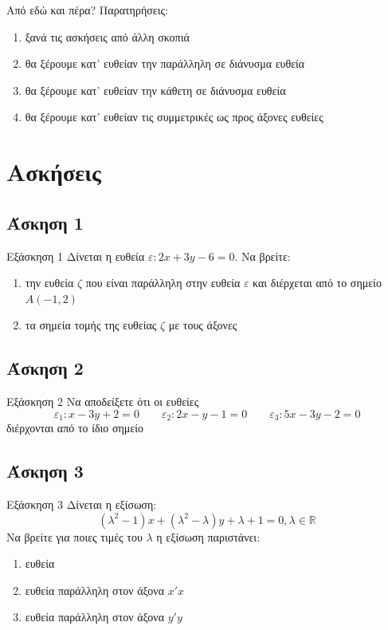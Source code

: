 \documentclass[greek]{beamer}
\begin{document}
\begin{frame}{Από εδώ και πέρα?}
 Παρατηρήσεις:
 \begin{enumerate}
  \item<1-> ξανά τις ασκήσεις από άλλη σκοπιά
  \item<2-> θα ξέρουμε κατ' ευθείαν την παράλληλη σε διάνυσμα ευθεία
  \item<3-> θα ξέρουμε κατ' ευθείαν την κάθετη σε διάνυσμα ευθεία
  \item<4-> θα ξέρουμε κατ' ευθείαν τις συμμετρικές ως προς άξονες ευθείες
 \end{enumerate}
\end{frame}

\section{Ασκήσεις}
\subsection{Άσκηση 1}
\begin{frame}[label=Άσκηση1]{Εξάσκηση 1}
 Δίνεται η ευθεία $ε:2x+3y-6=0$. Να βρείτε:
 \begin{enumerate}
  \item<1-> την ευθεία $ζ$ που είναι παράλληλη στην ευθεία $ε$ και διέρχεται από το σημείο $Α(-1,2)$
  \item<2-> τα σημεία τομής της ευθείας $ζ$ με τους άξονες
 \end{enumerate}

\end{frame}

\subsection{Άσκηση 2}
\begin{frame}[label=Άσκηση2]{Εξάσκηση 2}
 Να αποδείξετε ότι οι ευθείες
 $$ε_1:x-3y+2=0 \qquad ε_2:2x-y-1=0 \qquad ε_3:5x-3y-2=0$$
 διέρχονται από το ίδιο σημείο

\end{frame}

\subsection{Άσκηση 3}
\begin{frame}[label=Άσκηση3]{Εξάσκηση 3}
 Δίνεται η εξίσωση:
 $$(λ^2-1)x+(λ^2-λ)y+λ+1=0,λ\in\mathbb{R}$$
 Να βρείτε για ποιες τιμές του $λ$ η εξίσωση παριστάνει:
 \begin{enumerate}
  \item<1-> ευθεία
  \item<2-> ευθεία παράλληλη στον άξονα $x'x$
  \item<3-> ευθεία παράλληλη στον άξονα $y'y$
 \end{enumerate}

\end{frame}
\end{document}
